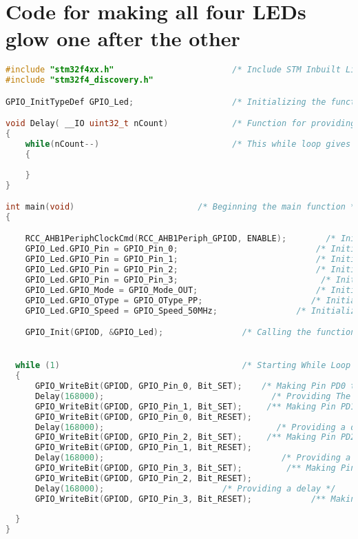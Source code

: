 \section{Code for making all four LEDs glow one after the other}
\begin{lstlisting}[language=C++]
#include "stm32f4xx.h"                        /* Include STM Inbuilt Library*/
#include "stm32f4_discovery.h"

GPIO_InitTypeDef GPIO_Led;                    /* Initializing the function */

void Delay( __IO uint32_t nCount)             /* Function for providing delay */
{
	while(nCount--)                           /* This while loop gives delay */
	{
		
	}
}

int main(void)                         /* Beginning the main function */
{

	RCC_AHB1PeriphClockCmd(RCC_AHB1Periph_GPIOD, ENABLE);        /* Initializing the Clock for port D and enabling it */
    GPIO_Led.GPIO_Pin = GPIO_Pin_0;                            /* Initializing the Pin PD0  */
    GPIO_Led.GPIO_Pin = GPIO_Pin_1;                            /* Initializing the Pin PD1 */
    GPIO_Led.GPIO_Pin = GPIO_Pin_2;                            /* Initializing the Pin PD2 */
    GPIO_Led.GPIO_Pin = GPIO_Pin_3;                             /* Initializing the Pin PD3 */
    GPIO_Led.GPIO_Mode = GPIO_Mode_OUT;                        /* Initializing the Pin PD0, PD1, PD2, PD3 to work in output Mode */
    GPIO_Led.GPIO_OType = GPIO_OType_PP;                      /* Initializing the Pin PD0, PD1, PD2, PD3 to work in Push Pull Mode */
    GPIO_Led.GPIO_Speed = GPIO_Speed_50MHz;                /* Initializing the spped of clock pulse */

    GPIO_Init(GPIOD, &GPIO_Led);                /* Calling the function Init by passing two values */


  while (1)                                     /* Starting While Loop */
  {
	  GPIO_WriteBit(GPIOD, GPIO_Pin_0, Bit_SET);    /* Making Pin PD0 to output as high*/
	  Delay(168000);                                  /* Providing The dealy */
	  GPIO_WriteBit(GPIOD, GPIO_Pin_1, Bit_SET);     /** Making Pin PD1 to ouput high and PD0 to output as low */
	  GPIO_WriteBit(GPIOD, GPIO_Pin_0, Bit_RESET);
	  Delay(168000);                                   /* Providing a delay */
	  GPIO_WriteBit(GPIOD, GPIO_Pin_2, Bit_SET);     /** Making Pin PD2 to ouput high and PD1 to output as low */
	  GPIO_WriteBit(GPIOD, GPIO_Pin_1, Bit_RESET);
	  Delay(168000);                                    /* Providing a delay */
	  GPIO_WriteBit(GPIOD, GPIO_Pin_3, Bit_SET);         /** Making Pin PD3 to ouput high and PD2 to output as low */
	  GPIO_WriteBit(GPIOD, GPIO_Pin_2, Bit_RESET);
	  Delay(168000);                        /* Providing a delay */
	  GPIO_WriteBit(GPIOD, GPIO_Pin_3, Bit_RESET);            /** Making Pin PD3 to ouput low */
	  
  }
}

\end{lstlisting}

